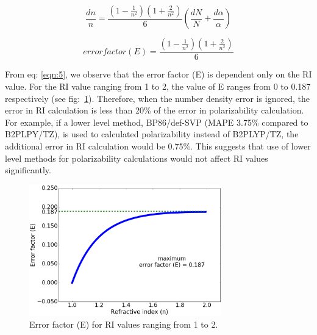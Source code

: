 \begin{equation} \label{eqn:4}
\frac{dn}{n}=\frac{(1-\frac{1}{n^2} )(1+\frac{2}{n^2})}{6}(\frac{dN}{N}+\frac{d\alpha}{\alpha})
\end{equation}

\begin{equation} \label{eqn:5}
error factor (E)=\frac{(1-\frac{1}{n^2} )(1+\frac{2}{n^2})}{6}
\end{equation}

From eq: \ref{eqn:5}, we observe that the error factor (E) is dependent only on the RI value. For the RI value ranging from 1 to 2, the value of E ranges from 0 to 0.187 respectively (see fig:\ \ref{fig:Error_factor}). Therefore, when the number density error is ignored, the error in RI calculation is less than 20\% of the error in polarizability calculation. For example, if a lower level method, BP86/def-SVP (MAPE 3.75\% compared to B2PLPY/TZ), is used to calculated polarizability instead of B2PLYP/TZ, the additional error in RI calculation would be 0.75\%. This suggests that use of lower level methods for polarizability calculations would not affect RI values significantly.

\begin{figure}[htbp]  
	\centering
	\includegraphics[width=0.744\textwidth]{Chapter-3/Figures/Error_factor.eps}
	\caption{Error factor (E) for RI values ranging from 1 to 2.} 
	\label{fig:Error_factor} 
\end{figure}  

